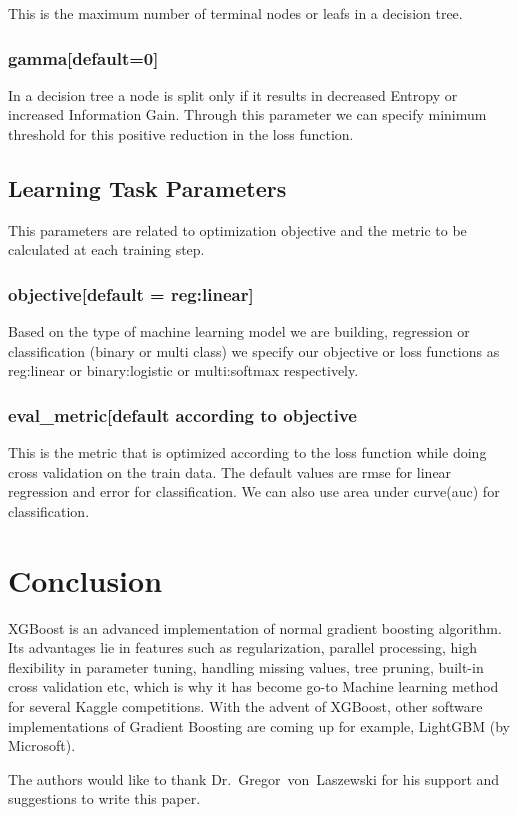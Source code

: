 This is the maximum number of terminal nodes or leafs in a decision tree.

\subsubsection{gamma[default=0]} 

In a decision tree a node is split only if it results in decreased Entropy or increased 
Information Gain. Through this parameter  we can specify minimum threshold for this positive 
reduction in the loss function.

\subsection{Learning Task Parameters} 

This parameters are related to optimization objective and the metric to be calculated at
each training step.

\subsubsection{objective[default = reg:linear]}

Based on the type of machine learning model we are building, regression or classification
(binary or multi class) we specify our objective or loss functions as reg:linear or
binary:logistic or  multi:softmax respectively.

\subsubsection{eval\_metric[default according to objective}

This is the metric that is optimized according to the loss function while doing cross 
validation on the train data. The default values are rmse for linear regression and  error 
for classification. We can also use area under curve(auc) for classification.

 

\section{Conclusion} 

 XGBoost is an advanced implementation of normal gradient boosting algorithm.
Its advantages lie in features  such as regularization, parallel processing,
high flexibility in parameter tuning, handling missing values, tree pruning,
built-in cross validation etc, which is why it has become go-to Machine learning
method for several Kaggle competitions. With the advent of XGBoost, other software
implementations of Gradient Boosting are coming up for example, LightGBM (by 
Microsoft).

\begin{acks}

  The authors would like to thank Dr.~Gregor~von~Laszewski for his
  support and suggestions to write this paper.

\end{acks}


 


